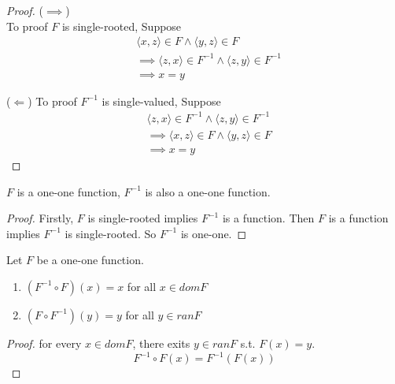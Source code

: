 \begin{proof}
    ($\implies $)\\
    To proof $F$ is single-rooted, Suppose
    \begin{align*}
        &\langle x,z \rangle \in F \land \langle y,z \rangle \in F\\
        &\implies \langle z,x \rangle \in F^{-1} \land \langle z,y \rangle \in F^{-1} \\
        &\implies x = y
    \end{align*}

    ($\Leftarrow $)
    To proof $F^{-1}$ is single-valued, Suppose
    \begin{align*}
        &\langle z,x\rangle \in F^{-1} \land \langle z,y \rangle \in F^{-1}\\
        &\implies \langle x,z \rangle \in F \land \langle y,z \rangle \in F\\
        &\implies x = y
    \end{align*}
\end{proof}

\begin{corollary}{}{}
    $F$ is a one-one function, $F^{-1}$ is also a one-one function.
\end{corollary}

\begin{proof}
    Firstly, $F$ is single-rooted implies $F^{-1}$ is a function. Then 
    $F$ is a function implies $F^{-1}$ is single-rooted. So $F^{-1}$ is one-one.
\end{proof}

\begin{theorem}{}{}
    Let $F$ be a one-one function.
    \begin{enumerate}

        \item $(F^{-1} \circ F)(x) = x$ for all $x \in domF$
        \item $(F \circ F^{-1})(y) = y$ for all $y \in ranF$

    \end{enumerate}
\end{theorem}

\begin{proof}
    for every $x \in domF$, there exits $y \in ranF$ s.t. $F(x) = y$.
    \begin{equation*}
        F^{-1} \circ F(x) = F^{-1}(F(x))
    \end{equation*}
\end{proof}

